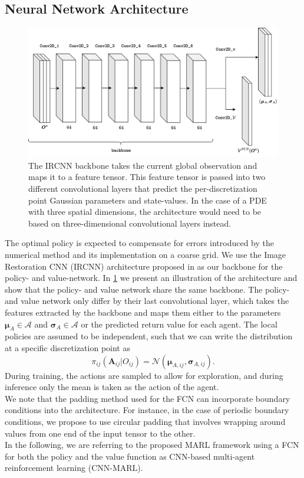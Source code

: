 \documentclass{article}
\theoremstyle{plain}
\theoremstyle{definition}
\theoremstyle{remark}
\begin{document}
\subsection{Neural Network Architecture}
\label{sec:nn}
\begin{figure}[ht]
\vskip 0.2in
\begin{center}
\centerline{\includegraphics[width=\columnwidth]{illustrations/IRCNN_compr.drawio.png}}
\caption{The IRCNN backbone takes the current global observation and maps it to a feature tensor. This feature tensor is passed into two different convolutional layers that predict the per-discretization point Gaussian parameters and state-values. In the case of a PDE with three spatial dimensions, the architecture would need to be based on three-dimensional convolutional layers instead. }
\label{fig:ircnn}
\end{center}
\vskip -0.2in
\end{figure}
The optimal policy is expected to compensate for errors introduced by the numerical method and its implementation on a  coarse grid. We use the Image Restoration CNN (IRCNN) architecture proposed in \cite{ircnn} as our backbone for the policy- and value-network. In \cref{fig:ircnn} we present an illustration of the architecture and show that the policy- and value network share the same backbone. The policy- and value network only differ by their last convolutional layer, which takes the features extracted by the backbone and maps them either to the parameters $\boldsymbol \mu_A \in \mathcal A$ and $\boldsymbol \sigma_A \in \mathcal A$ or the predicted return value for each agent.  The local policies are assumed to be independent, such that we can write the distribution at a specific discretization point as
\begin{equation}
\pi_{ij}( \boldsymbol{A}_{ij}| O_{ij}) = \mathcal N( \boldsymbol{\mu}_{A,ij},  \boldsymbol{\sigma}_{A,ij}).
\end{equation}
During training, the actions are sampled to allow for exploration, and during inference only the mean is taken as the action of the agent.\\
We note that the padding method used for the FCN can incorporate boundary conditions into the architecture. For instance, in the case of periodic boundary conditions, we propose to use circular padding that involves wrapping around values from one end of the input tensor to the other. \\
In the following, we are referring to the proposed MARL framework using a FCN for both the policy and the value function as CNN-based multi-agent reinforcement learning (CNN-MARL).
\end{document}
